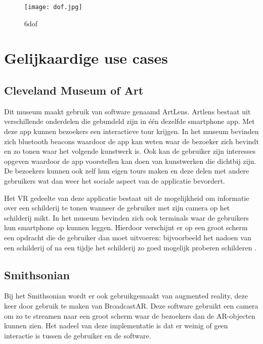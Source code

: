 \begin{figure}
    \texttt{[image: dof.jpg]}
    \caption{\acrfull{6dof}}
    \label{fig:dof}
\end{figure}


\section{Gelijkaardige use cases}
\subsection{Cleveland Museum of Art}\label{ch:cleveland}
Dit museum maakt gebruik van software genaamd ArtLens. Artlens bestaat uit verschillende onderdelen die gebundeld zijn in één dezelfde smartphone app. Met deze app kunnen bezoekers een interactieve tour krijgen. In het museum bevinden zich bluetooth beacons waardoor de app kan weten waar de bezoeker zich bevindt en zo tonen waar het volgende kunstwerk is. Ook kan de gebruiker zijn interesses opgeven waardoor de app voorstellen kan doen van kunstwerken die dichtbij zijn. 
De bezoekers kunnen ook zelf hun eigen tours maken en deze delen met andere gebruikers wat dan weer het sociale aspect van de applicatie bevordert.

Het VR gedeelte van deze applicatie bestaat uit de mogelijkheid om informatie over een schilderij te tonen wanneer de gebruiker met zijn camera op het schilderij mikt.
In het museum bevinden zich ook terminals waar de gebruikers hun smartphone op kunnen leggen. Hierdoor verschijnt er op een groot scherm een opdracht die de gebruiker dan moet uitvoeren: bijvoorbeeld het nadoen van een schilderij of na een tijdje het schilderij zo goed mogelijk proberen schilderen \autocite{Ding2017}.

\subsection{Smithsonian}
Bij het Smithsonian wordt er ook gebruikgemaakt van augmented reality, deze keer door gebruik te maken van BroadcastAR. Deze software gebruikt een camera om zo te streamen naar een groot scherm waar de bezoekers dan de AR-objecten kunnen zien. Het nadeel van deze implementatie is dat er weinig of geen interactie is tussen de gebruiker en de software. 

